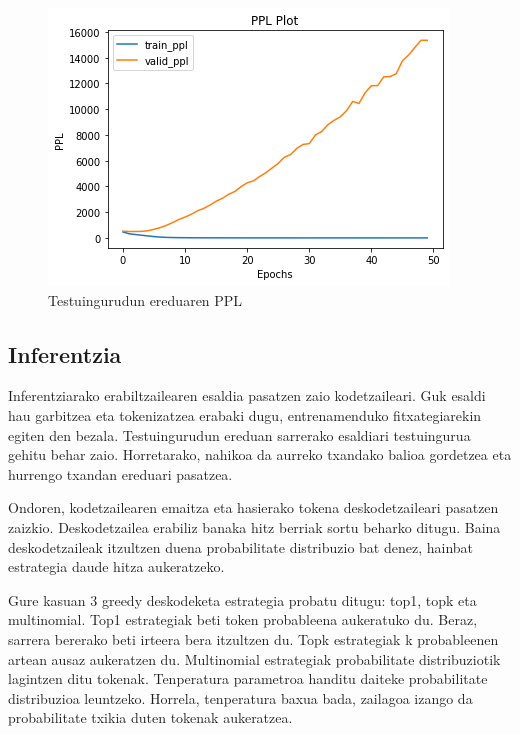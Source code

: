 \documentclass[11pt,a4paper]{article}
\begin{document}
\begin{figure}[ht]
    \centering
    \includegraphics[width=\linewidth]{ppl_context}
    \caption{Testuingurudun ereduaren PPL}
    \label{fig:ppl_context}
\end{figure}

\subsection{Inferentzia}
Inferentziarako erabiltzailearen esaldia pasatzen zaio kodetzaileari. Guk esaldi hau garbitzea eta tokenizatzea erabaki dugu, entrenamenduko fitxategiarekin egiten den bezala. Testuingurudun ereduan sarrerako esaldiari testuingurua gehitu behar zaio. Horretarako, nahikoa da aurreko txandako balioa gordetzea eta hurrengo txandan ereduari pasatzea.

Ondoren, kodetzailearen emaitza eta hasierako tokena deskodetzaileari pasatzen zaizkio. Deskodetzailea erabiliz banaka hitz berriak sortu beharko ditugu. Baina deskodetzaileak itzultzen duena probabilitate distribuzio bat denez, hainbat estrategia daude hitza aukeratzeko.

Gure kasuan 3 greedy deskodeketa estrategia probatu ditugu: top1, topk eta multinomial. Top1 estrategiak beti token probableena aukeratuko du. Beraz, sarrera bererako beti irteera bera itzultzen du. Topk estrategiak k probableenen artean ausaz aukeratzen du. Multinomial estrategiak probabilitate distribuziotik lagintzen ditu tokenak. Tenperatura parametroa handitu daiteke probabilitate distribuzioa leuntzeko. Horrela, tenperatura baxua bada, zailagoa izango da probabilitate txikia duten tokenak aukeratzea.
\end{document}
